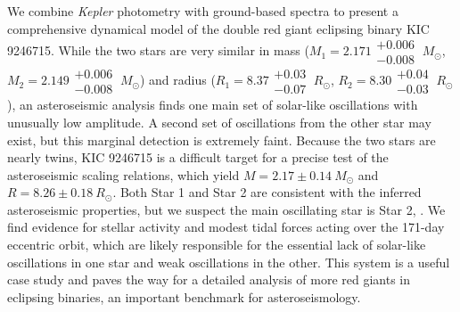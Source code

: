 We combine \emph{Kepler} photometry with ground-based spectra to present a comprehensive dynamical model of the double red giant eclipsing binary KIC 9246715. While the two stars are very similar in mass ($M_1 = 2.171\substack{+0.006 \\ -0.008} \ M_{\odot}$, $M_2 = 2.149\substack{+0.006 \\ -0.008} \ M_{\odot}$) and radius ($R_1 = 8.37\substack{+0.03 \\ -0.07} \ R_{\odot}$, $R_2 = 8.30\substack{+0.04 \\ -0.03} \ R_{\odot}$), an asteroseismic analysis finds one main set of solar-like oscillations with unusually low amplitude. A second set of oscillations from the other star may exist, but this marginal detection is extremely faint. Because the two stars are nearly twins, KIC 9246715 is a difficult target for a precise test of the asteroseismic scaling relations, which yield $M = 2.17\pm0.14 \ M_{\odot}$ and $R = 8.26\pm0.18 \ R_{\odot}$. Both Star 1 and Star 2 are consistent with the inferred asteroseismic properties, but we suspect the main oscillating star is Star 2, . We find evidence for stellar activity and modest tidal forces acting over the 171-day eccentric orbit, which are likely responsible for the essential lack of solar-like oscillations in one star and weak oscillations in the other.  This system is a useful case study and paves the way for a detailed analysis of more red giants in eclipsing binaries, an important benchmark for asteroseismology.
  
  
  
  
  